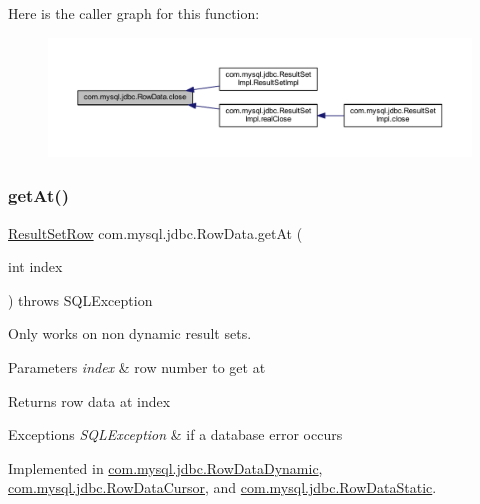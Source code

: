 Here is the caller graph for this function\+:
\nopagebreak
\begin{figure}[H]
\begin{center}
\leavevmode
\includegraphics[width=350pt]{interfacecom_1_1mysql_1_1jdbc_1_1_row_data_ac548da95fe41cee544964af3b6d734a6_icgraph}
\end{center}
\end{figure}
\mbox{\label{interfacecom_1_1mysql_1_1jdbc_1_1_row_data_a25cc7589897136ff05959212ce3e9063}} 
\subsubsection{\texorpdfstring{get\+At()}{getAt()}}
{\footnotesize\ttfamily \mbox{\hyperlink{classcom_1_1mysql_1_1jdbc_1_1_result_set_row}{Result\+Set\+Row}} com.\+mysql.\+jdbc.\+Row\+Data.\+get\+At (\begin{DoxyParamCaption}\item[{int}]{index }\end{DoxyParamCaption}) throws S\+Q\+L\+Exception}

Only works on non dynamic result sets.


\begin{DoxyParams}{Parameters}
{\em index} & row number to get at \\
\hline
\end{DoxyParams}
\begin{DoxyReturn}{Returns}
row data at index 
\end{DoxyReturn}

\begin{DoxyExceptions}{Exceptions}
{\em S\+Q\+L\+Exception} & if a database error occurs \\
\hline
\end{DoxyExceptions}


Implemented in \mbox{\hyperlink{classcom_1_1mysql_1_1jdbc_1_1_row_data_dynamic_a8d011f77f4119fb0bb18623bc874ae3e}{com.\+mysql.\+jdbc.\+Row\+Data\+Dynamic}}, \mbox{\hyperlink{classcom_1_1mysql_1_1jdbc_1_1_row_data_cursor_a0027f3f5693ea4392c71528296e25e86}{com.\+mysql.\+jdbc.\+Row\+Data\+Cursor}}, and \mbox{\hyperlink{classcom_1_1mysql_1_1jdbc_1_1_row_data_static_a02904125e29bcc258c12f839338a4937}{com.\+mysql.\+jdbc.\+Row\+Data\+Static}}.

